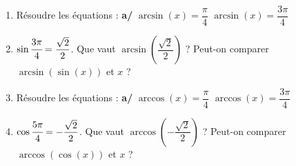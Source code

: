 
\begin{exercice}\label{exostarterST-0010-0011}

\begin{enumerate}
\item Résoudre  les équations : {\bfseries  a/} $\arcsin (x) = \dfrac{\pi}{4}$    $\arcsin (x) = \dfrac{3\pi}{4}$
\item $\sin \cfrac{3\pi}4=\dfrac{\sqrt2}2$. Que vaut $\arcsin(\dfrac{\sqrt{2}}2)$ ? Peut-on comparer $\arcsin(\sin (x))$ et $x$ ?
\item Résoudre  les équations : {\bfseries  a/} $\arccos (x) = \dfrac{\pi}{4}$    $\arccos (x) = \dfrac{3\pi}{4}$
\item $\cos \cfrac{5\pi}4=-\dfrac{\sqrt2}2$. Que vaut $\arccos(-\dfrac{\sqrt{2}}2)$ ? Peut-on comparer $\arccos(\cos (x))$ et $x$ ?
\end{enumerate}

\end{exercice}
